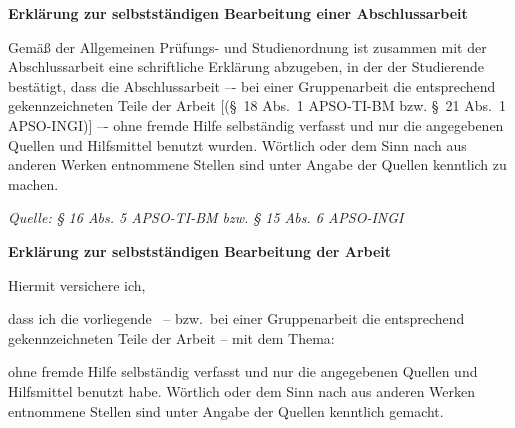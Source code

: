 \clearpage
\thispagestyle{plain}
\ITocEntryStatement
\textbf{\sffamily\large Erklärung zur selbstständigen Bearbeitung einer Abschlussarbeit}

{\footnotesize
Gemäß der Allgemeinen Prüfungs- und Studienordnung ist zusammen mit der Abschlussarbeit eine schriftliche Erklärung abzugeben, in der der Studierende bestätigt, dass die Abschlussarbeit \glqq–- bei einer Gruppenarbeit die entsprechend gekennzeichneten Teile der Arbeit [(§~18 Abs.~1 APSO-TI-BM bzw. §~21 Abs.~1 APSO-INGI)] –- ohne fremde Hilfe selbständig verfasst und nur die angegebenen Quellen und Hilfsmittel benutzt wurden. Wörtlich oder dem Sinn nach aus anderen Werken entnommene Stellen sind unter Angabe der Quellen kenntlich zu machen.\grqq
}

\hfill {\em\footnotesize Quelle: § 16 Abs. 5 APSO-TI-BM bzw. § 15 Abs. 6 APSO-INGI}

\vspace{1cm}
\textbf{\sffamily Erklärung zur selbstständigen Bearbeitung der Arbeit}

Hiermit versichere ich,
\par\noindent{}    \makebox[8cm]{\hrulefill}
\par\noindent{} \makebox[8cm]{\hrulefill}

dass ich die vorliegende \IthesisKindDE\ -- bzw.\ bei einer Gruppenarbeit die entsprechend gekennzeichneten Teile der Arbeit -- mit dem Thema:

\textbf{\IthesisTitle}

ohne fremde Hilfe selbständig verfasst und nur die angegebenen Quellen und Hilfsmittel benutzt habe.
Wörtlich oder dem Sinn nach aus anderen Werken entnommene Stellen sind unter Angabe der Quellen kenntlich gemacht.

\vspace{1cm}
\noindent\makebox[3cm]{\hrulefill} \hspace{0.1cm}
    \makebox[3cm]{\hrulefill} \hspace{0.1cm}
    \makebox[6cm]{\hrulefill} \\
\noindent{} \hspace{0.1cm}
     \hspace{0.1cm}

\clearpage
